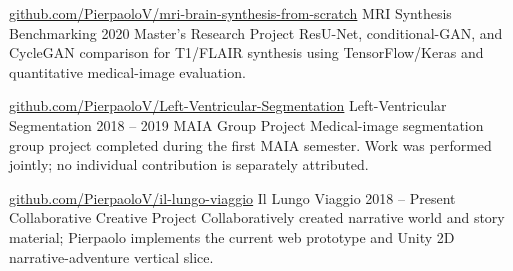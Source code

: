 \begin{cventries}
\cventry
  {\href{https://github.com/PierpaoloV/mri-brain-synthesis-from-scratch}{github.com/PierpaoloV/mri-brain-synthesis-from-scratch}}
  {MRI Synthesis Benchmarking}
  {2020}
  {Master's Research Project}
  {ResU-Net, conditional-GAN, and CycleGAN comparison for T1/FLAIR synthesis using TensorFlow/Keras and quantitative medical-image evaluation.}

\cventry
  {\href{https://github.com/PierpaoloV/Left-Ventricular-Segmentation}{github.com/PierpaoloV/Left-Ventricular-Segmentation}}
  {Left-Ventricular Segmentation}
  {2018 -- 2019}
  {MAIA Group Project}
  {Medical-image segmentation group project completed during the first MAIA semester. Work was performed jointly; no individual contribution is separately attributed.}

\cventry
  {\href{https://github.com/PierpaoloV/il-lungo-viaggio}{github.com/PierpaoloV/il-lungo-viaggio}}
  {Il Lungo Viaggio}
  {2018 -- Present}
  {Collaborative Creative Project}
  {Collaboratively created narrative world and story material; Pierpaolo implements the current web prototype and Unity 2D narrative-adventure vertical slice.}
\end{cventries}
